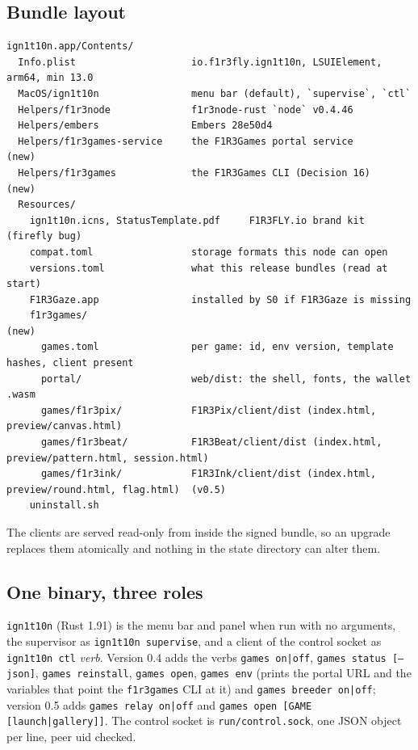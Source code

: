 \documentclass[11pt]{article}
\theoremstyle{definition}
\theoremstyle{remark}
\newcommand{\code}[1]{\texttt{#1}}
\begin{document}
\subsection{Bundle layout}

\begin{lstlisting}
ign1t10n.app/Contents/
  Info.plist                    io.f1r3fly.ign1t10n, LSUIElement, arm64, min 13.0
  MacOS/ign1t10n                menu bar (default), `supervise`, `ctl`
  Helpers/f1r3node              f1r3node-rust `node` v0.4.46
  Helpers/embers                Embers 28e50d4
  Helpers/f1r3games-service     the F1R3Games portal service          (new)
  Helpers/f1r3games             the F1R3Games CLI (Decision 16)        (new)
  Resources/
    ign1t10n.icns, StatusTemplate.pdf     F1R3FLY.io brand kit (firefly bug)
    compat.toml                 storage formats this node can open
    versions.toml               what this release bundles (read at start)
    F1R3Gaze.app                installed by S0 if F1R3Gaze is missing
    f1r3games/                                                           (new)
      games.toml                per game: id, env version, template hashes, client present
      portal/                   web/dist: the shell, fonts, the wallet .wasm
      games/f1r3pix/            F1R3Pix/client/dist (index.html, preview/canvas.html)
      games/f1r3beat/           F1R3Beat/client/dist (index.html, preview/pattern.html, session.html)
      games/f1r3ink/            F1R3Ink/client/dist (index.html, preview/round.html, flag.html)  (v0.5)
    uninstall.sh
\end{lstlisting}

\noindent
The clients are served read-only from inside the signed bundle, so an upgrade
replaces them atomically and nothing in the state directory can alter them.

\subsection{One binary, three roles}

\code{ign1t10n} (Rust 1.91) is the menu bar and panel when run with no arguments, the
supervisor as \code{ign1t10n supervise}, and a client of the control socket as
\code{ign1t10n ctl} \textit{verb}. Version 0.4 adds the verbs \code{games on|off},
\code{games status [--json]}, \code{games reinstall}, \code{games open},
\code{games env} (prints the portal URL and the variables that point the
\code{f1r3games} CLI at it) and \code{games breeder on|off}; version 0.5 adds
\code{games relay on|off} and \code{games open [GAME [launch|gallery]]}. The control
socket is \code{run/control.sock}, one JSON object per line, peer uid checked.
\end{document}
